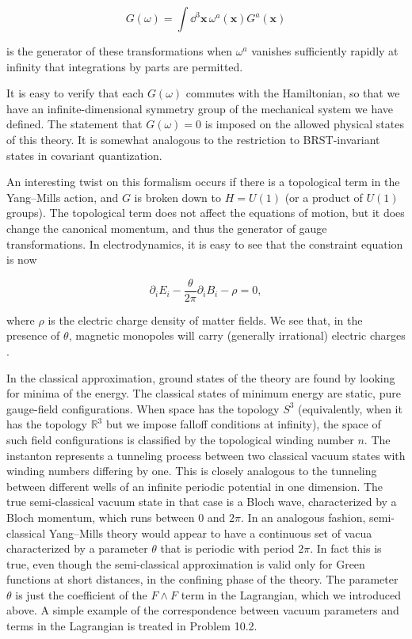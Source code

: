 \[
  G(\omega)=\int\dd^3\mathbf x\,\omega^a(\mathbf x)G^a(\mathbf x)
\]

is the generator of these transformations when $\omega^a$ vanishes sufficiently
rapidly at infinity that integrations by parts are permitted.

It is easy to verify that each $G(\omega)$ commutes with the Hamiltonian, so that
we have an infinite-dimensional symmetry group of the mechanical system we have
defined. The statement that $G(\omega)=0$ is imposed on the allowed physical
states of this theory. It is somewhat analogous to the restriction to
BRST-invariant states in covariant quantization.

An interesting twist on this formalism occurs if there is a topological term in
the Yang--Mills action, and $G$ is broken down to $H=U(1)$ (or a product of
$U(1)$ groups). The topological term does not affect the equations of motion, but
it does change the canonical momentum, and thus the generator of gauge
transformations. In electrodynamics, it is easy to see that the constraint
equation is now

\[
  \partial_iE_i-\frac{\theta}{2\pi}\partial_iB_i-\rho=0,
\]

where $\rho$ is the electric charge density of matter fields. We see that, in the
presence of $\theta$, magnetic monopoles will carry (generally irrational)
electric charges \cite{banks-ref-140}.

In the classical approximation, ground states of the theory are found by looking
for minima of the energy. The classical states of minimum energy are static,
pure gauge-field configurations. When space has the topology $S^3$ (equivalently,
when it has the topology $\mathbb R^3$ but we impose falloff conditions at
infinity), the space of such field configurations is classified by the
topological winding number $n$. The instanton represents a tunneling process
between two classical vacuum states with winding numbers differing by one. This
is closely analogous to the tunneling between different wells of an infinite
periodic potential in one dimension. The true semi-classical vacuum state in
that case is a Bloch wave, characterized by a Bloch momentum, which runs between
$0$ and $2\pi$. In an analogous fashion, semi-classical Yang--Mills theory would
appear to have a continuous set of vacua characterized by a parameter $\theta$
that is periodic with period $2\pi$. In fact this is true, even though the
semi-classical approximation is valid only for Green functions at short
distances, in the confining phase of the theory. The parameter $\theta$ is just
the coefficient of the $F\wedge F$ term in the Lagrangian, which we introduced
above. A simple example of the correspondence between vacuum parameters and
terms in the Lagrangian is treated in Problem 10.2.


